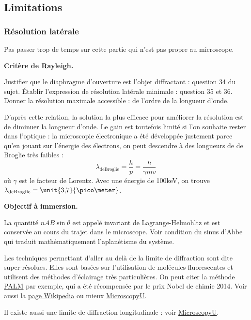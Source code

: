 \subsection{Limitations}

\subsubsection{Résolution latérale}

Pas passer trop de temps sur cette partie qui n'est pas propre au microscope.

\begin{slide}
\textbf{Critère de Rayleigh.}
\end{slide} 

Justifier que le diaphragme d'ouverture est l'objet diffractant : question 34 du sujet.
Établir l'expression de résolution latérale minimale : question 35 et 36.
Donner la résolution maximale accessible : de l'ordre de la longueur d'onde.
\begin{remarque}
D'après cette relation, la solution la plus efficace pour améliorer la résolution est de diminuer la longueur d'onde.
Le gain est toutefois limité si l'on souhaite rester dans l'optique : la microscopie électronique a été développée justement parce qu'en jouant sur l'énergie des électrons, on peut descendre à des longueurs de de Broglie très faibles :
\begin{equation}
\lambda_\mathrm{deBroglie} = \frac{h}{p} = \frac{h}{\gamma mv}
\end{equation}
où $\gamma$ est le facteur de Lorentz.
Avec une énergie de \unit{100}{keV}, on trouve $\lambda_\mathrm{deBroglie}=\unit{3{,}7}{\pico\meter}$.
\end{remarque}

\begin{slide}
\textbf{Objectif à immersion.}
\end{slide}

\begin{remarque}
La quantité $nAB\sin\theta$ est appelé invariant de Lagrange-Helmohltz et est conservée au cours du trajet dans le microscope.
Voir condition du sinus d'Abbe qui traduit mathématiquement l'aplanétisme du système.

\noindent
Les techniques permettant d'aller au delà de la limite de diffraction sont dite super-résolues.
Elles sont basées sur l'utilisation de molécules fluorescentes et utilisent des méthodes d'éclairage très particulières.
On peut citer la méthode \href{https://science.sciencemag.org/content/313/5793/1642}{PALM} par exemple, qui a été récompensée par le prix Nobel de chimie 2014.
Voir aussi la \href{https://fr.wikipedia.org/wiki/Microscopie_PALM}{page Wikipedia} ou mieux \href{https://www.microscopyu.com/techniques/super-resolution/single-molecule-super-resolution-imaging}{MicroscopyU}.

\noindent
Il existe aussi une limite de diffraction longitudinale : voir \href{https://www.microscopyu.com/techniques/super-resolution/the-diffraction-barrier-in-optical-microscopy}{MicroscopyU}.
\end{remarque}

